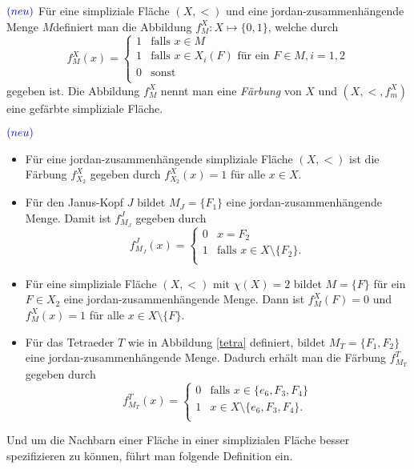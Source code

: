 \documentclass[12pt,titlepage]{article}
\begin{document}
\begin{definition}$\textcolor{blue}{(neu)}$
Für eine simpliziale Fläche $(X,<)$ und eine jordan-zusammenhängende Menge $M$definiert man die Abbildung $f_M^X:X \mapsto\{0,1\}$, welche durch
\[
f^X_M(x)=\begin{cases}
1 & \text{falls } x\in M\\
1 & \text{falls } x \in X_i(F) \text{ für ein }F \in M ,i=1,2\\
0 &\text{sonst}\\

\end{cases}
\]
gegeben ist.
Die Abbildung $f_M^X$ nennt man eine \emph{Färbung} von $X$ und $(X,<,f_m^X)$ eine gefärbte simpliziale Fläche.
\end{definition}

\begin{bsp}$\textcolor{blue}{(neu)}$
\begin{itemize}
\item Für eine jordan-zusammenhängende simpliziale Fläche $(X,<)$ ist die Färbung $f^X_{X_2}$ gegeben durch $f_{X_2}^X(x)=1$ für alle $x \in X$.

\item Für den Janus-Kopf $J$ bildet $M_J=\{F_1\}$ eine jordan-zusammenhängende Menge. Damit ist $f^J_{M_J}$ gegeben durch
\[
f^J_{M_J}(x)=\begin{cases}
0 &x=F_2\\
1 & \text{falls } x\in X\setminus \{F_2\}.\\
		\end{cases}
\]
\item Für eine simpliziale Fläche $(X,<)$ mit $\chi(X)=2$ bildet $M=\{F\}$ für ein $F \in X_2$ eine jordan-zusammenhängende Menge. Dann ist $f_M^X(F)=0$ und $f_M^X(x)=1$ für alle $x \in X\setminus \{F\}$.
\item Für das Tetraeder $T$ wie in Abbildung \ref{tetra} definiert, bildet $M_T=\{F_1,F_2\}$ eine jordan-zusammenhängende Menge. Dadurch erhält man die Färbung $f^T_{M_T}$ gegeben durch
\[
f^T_{M_T}(x)=\begin{cases}
		0 & \text{falls } x  \in \{e_6,F_3,F_4\}\\
1 &x \in X\setminus \{e_6,F_3,F_4\}.\\
		\end{cases}
\]
\end{itemize}
\end{bsp}
Und um die Nachbarn einer Fläche in einer simplizialen Fläche besser spezifizieren zu können, führt man folgende Definition ein.
\end{document}
